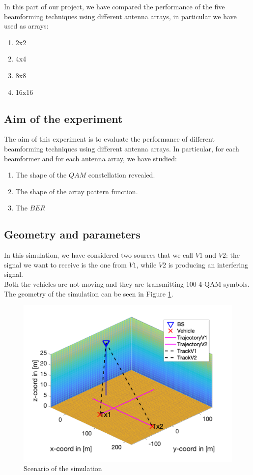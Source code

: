 In this part of our project, we have compared the performance of the five beamforming techniques using different antenna arrays,
in particular we have used as arrays:

\begin{enumerate}
    \item 2x2
    \item 4x4
    \item 8x8
    \item 16x16
\end{enumerate}

\subsection{Aim of the experiment}

The aim of this experiment is to evaluate the performance of different beamforming techniques using different antenna arrays. In 
particular, for each beamformer and for each antenna array, we have studied:

\begin{enumerate}
    \item The shape of the $QAM$ constellation revealed. 
    \item The shape of the array pattern function.
    \item The $BER$
\end{enumerate}

\subsection{Geometry and parameters}

In this simulation, we have considered two sources that we call $V1$ and $V2$: the signal we want to receive is the one from $V1$,
while $V2$ is producing an interfering signal.\\ 
Both the vehicles are not moving and they are transmitting 100 4-QAM symbols.\\
The geometry of the simulation can be seen in Figure \ref{fig:Scenario_still}.

\begin{figure}[ht]
    \includegraphics[width=\linewidth]{Quadriga1.png}
    \caption{Scenario of the simulation}
    \label{fig:Scenario_still}
\end{figure}


